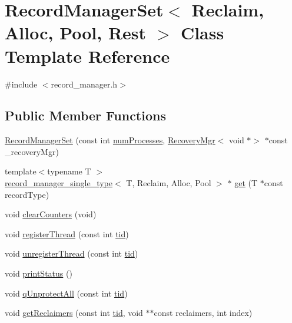 \hypertarget{classRecordManagerSet}{}\section{Record\+Manager\+Set$<$ Reclaim, Alloc, Pool, Rest $>$ Class Template Reference}
\label{classRecordManagerSet}


{\ttfamily \#include $<$record\+\_\+manager.\+h$>$}

\subsection*{Public Member Functions}
\begin{DoxyCompactItemize}
\item 
\hyperlink{classRecordManagerSet_a2a1dcedae6027d7a0c0b91cd02a3914e}{Record\+Manager\+Set} (const int \hyperlink{testing_8cpp_aa085812188e21ede75351d88b9b2c30d}{num\+Processes}, \hyperlink{classRecoveryMgr}{Recovery\+Mgr}$<$ void $\ast$$>$ $\ast$const \+\_\+recovery\+Mgr)
\item 
{\footnotesize template$<$typename T $>$ }\\\hyperlink{classrecord__manager__single__type}{record\+\_\+manager\+\_\+single\+\_\+type}$<$ T, Reclaim, Alloc, Pool $>$ $\ast$ \hyperlink{classRecordManagerSet_a36b6a81acd2b1108f453b748fad29f63}{get} (T $\ast$const record\+Type)
\item 
void \hyperlink{classRecordManagerSet_a7ea98e08390be42bcce2692fdb78530d}{clear\+Counters} (void)
\item 
void \hyperlink{classRecordManagerSet_aed788a9c714f6c4f51c15b804eded9a0}{register\+Thread} (const int \hyperlink{microbench_2main_8cpp_a9ca9869868fe7e7a38a921cc7de4103f}{tid})
\item 
void \hyperlink{classRecordManagerSet_ac56766fc083cf2e80afb190e677c9a48}{unregister\+Thread} (const int \hyperlink{microbench_2main_8cpp_a9ca9869868fe7e7a38a921cc7de4103f}{tid})
\item 
void \hyperlink{classRecordManagerSet_aaf22c9991972f1e8c288c2b61cbbea51}{print\+Status} ()
\item 
void \hyperlink{classRecordManagerSet_ac2ffb64b677be27096a3ac3cd01e5bb4}{q\+Unprotect\+All} (const int \hyperlink{microbench_2main_8cpp_a9ca9869868fe7e7a38a921cc7de4103f}{tid})
\item 
void \hyperlink{classRecordManagerSet_aa0ba6ecff5652ee607893956d9abfb76}{get\+Reclaimers} (const int \hyperlink{microbench_2main_8cpp_a9ca9869868fe7e7a38a921cc7de4103f}{tid}, void $\ast$$\ast$const reclaimers, int index)

\end{DoxyCompactItemize}
